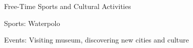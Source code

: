 \begin{cventries}

	\cventry
	{Free-Time} %
	{Sports and Cultural Activities} %
	{} %
	{} %
	{
		\begin{cvitems} %
            \item {Sports: Waterpolo}
            \item {Events: Visiting museum, discovering new cities and culture}
		\end{cvitems}
	}
    {}
\end{cventries}
